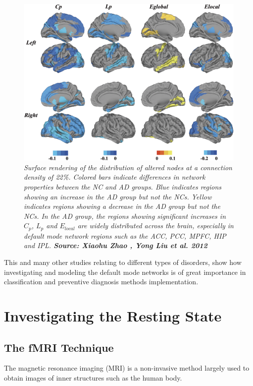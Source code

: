 \documentclass[12pt,openright,twoside,a4paper]{book}
\begin{document}
\begin{figure}[!h]
\centering
\includegraphics[scale=0.5]{rsz}
\caption{\textit{Surface rendering of the distribution of altered nodes at a connection density of 22\%.
Colored bars indicate differences in network properties between the NC and AD groups. Blue indicates regions showing an increase in the AD group but not the NCs. Yellow indicates regions showing a decrease in the AD group but not the NCs. In the AD group, the regions showing significant increases in $C_p$, $L_p$ and $E_{local}$ are widely distributed across the brain, especially in default mode network regions such as the ACC, PCC, MPFC, HIP and IPL. \textbf{Source: Xiaohu Zhao , Yong Liu et al. 2012 \cite{ssa}}}}
\label{rsz}
\end{figure}

This and many other studies relating to different types of disorders, show how investigating and modeling the default mode networks is of great importance in classification and preventive diagnosis methods implementation.

\clearpage

\section{Investigating the Resting State}

\subsection{The fMRI Technique}

The magnetic resonance imaging (MRI) is a non-invasive method largely used to obtain images of inner structures such as the human body.
\end{document}
